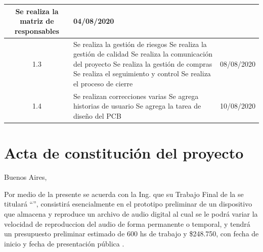 \documentclass[11pt]{charter}
\begin{document}
\begin{table}[ht]
\begin{tabularx}{\linewidth}{@{}|c|X|c|@{}}
Se realiza la matriz de responsables & 04/08/2020\\ \hline
1.3      & Se realiza la gestión de riesgos \newline                                                                              
Se realiza la gestión de calidad\newline                                                                              
Se realiza la comunicación del proyecto \newline                                                                              
Se realiza la gestión de compras \newline                                                                              
Se realiza el seguimiento y control \newline                                                                              
Se realiza el proceso de cierre & 08/08/2020\\ \hline
1.4      & Se realizan correcciones varias \newline                                                                              
Se agrega historias de usuario\newline                                                                              
Se agrega la tarea de diseño del PCB  & 10/08/2020\\ \hline
\end{tabularx}
\end{table}

\pagebreak



\section{Acta de constitución del proyecto}
\label{sec:acta}

\begin{flushright}
Buenos Aires, \fechaInicioName
\end{flushright}

\vspace{2cm}

Por medio de la presente se acuerda con la Ing. \authorname\hspace{1px} que su Trabajo Final de la \degreename\hspace{1px} se titulará ``\ttitle'', consistirá esencialmente en el prototipo preliminar de un dispositivo que almacena y reproduce un archivo de audio digital al cual se le podrá variar la velocidad de reproduccion del audio de forma permanente o temporal, y tendrá un presupuesto preliminar estimado de 600 hs de trabajo y \$248.750, con fecha de inicio \fechaInicioName\hspace{1px} y fecha de presentación pública \fechaFinalName.
\end{document}
